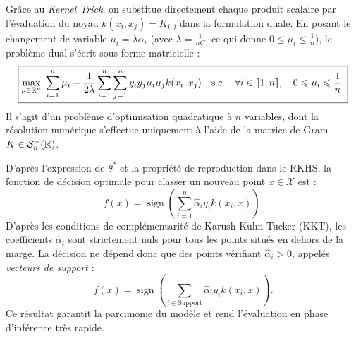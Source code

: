 Grâce au \emph{Kernel Trick}, on substitue directement chaque produit scalaire par l'évaluation du noyau $k(x_i, x_j) = K_{i,j}$ dans la formulation duale. En posant le changement de variable $\mu_i = \lambda \alpha_i$ (avec $\lambda = \frac{1}{nC}$, ce qui donne $0 \leqslant \mu_i \leqslant \frac{1}{n}$), le problème dual s'écrit sous forme matricielle :
\begin{equation}
    \boxed{\max_{\mu \in \mathbb{R}^n} \; \sum_{i=1}^n \mu_i - \frac{1}{2\lambda} \sum_{i=1}^n \sum_{j=1}^n y_i y_j \mu_i \mu_j k(x_i, x_j) \quad \text{s.c.} \quad \forall i \in \llbracket 1, n \rrbracket, \quad 0 \leqslant \mu_i \leqslant \frac{1}{n}.}
\end{equation}
Il s'agit d'un problème d'optimisation quadratique à $n$ variables, dont la résolution numérique s'effectue uniquement à l'aide de la matrice de Gram $K \in \mathcal{S}_n^+(\mathbb{R})$.

\begin{proposition}
    D'après l'expression de $\theta^*$ et la propriété de reproduction dans le RKHS, la fonction de décision optimale pour classer un nouveau point $x \in \mathcal{X}$ est :
    \begin{equation}
        f(x) = \operatorname{sign}\left( \sum_{i=1}^n \hat{\alpha}_i y_i k(x_i, x) \right).
    \end{equation}
    D'après les conditions de complémentarité de Karush-Kuhn-Tucker (KKT), les coefficients $\hat{\alpha}_i$ sont strictement nuls pour tous les points situés en dehors de la marge. La décision ne dépend donc que des points vérifiant $\hat{\alpha}_i > 0$, appelés \emph{vecteurs de support} :
    \begin{equation}
        f(x) = \operatorname{sign}\left( \sum_{i \in \mathrm{Support}} \hat{\alpha}_i y_i k(x_i, x) \right).
    \end{equation}
    Ce résultat garantit la parcimonie du modèle et rend l'évaluation en phase d'inférence très rapide.
\end{proposition}

